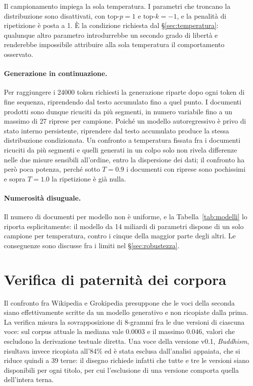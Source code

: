 Il campionamento impiega la sola temperatura. I parametri che troncano la
distribuzione sono disattivati, con $\mathrm{top}\text{-}p = 1$ e
$\mathrm{top}\text{-}k = -1$, e la penalità di ripetizione è posta a 1. È la
condizione richiesta dal §\ref{sec:temperatura}: qualunque altro parametro
introdurrebbe un secondo grado di libertà e renderebbe impossibile attribuire
alla sola temperatura il comportamento osservato.

\paragraph{Generazione in continuazione.}
Per raggiungere i \num{24000} token richiesti la generazione riparte dopo ogni
token di fine sequenza, riprendendo dal testo accumulato fino a quel punto. I
documenti prodotti sono dunque ricuciti da più segmenti, in numero variabile fino
a un massimo di 27 riprese per campione. Poiché un modello autoregressivo è privo
di stato interno persistente, riprendere dal testo accumulato produce la stessa
distribuzione condizionata. Un confronto a temperatura fissata fra i documenti
ricuciti da più segmenti e quelli generati in un colpo solo non rivela
differenze nelle due misure sensibili all'ordine, entro la dispersione dei dati;
il confronto ha però poca potenza, perché sotto $T = 0.9$ i documenti con
riprese sono pochissimi e sopra $T = 1.0$ la ripetizione è già nulla.

\paragraph{Numerosità disuguale.}
Il numero di documenti per modello non è uniforme, e la
Tabella~\ref{tab:modelli} lo riporta esplicitamente: il modello da 14 miliardi
di parametri dispone di un solo campione per temperatura, contro i cinque della
maggior parte degli altri. Le conseguenze sono discusse fra i limiti nel
§\ref{sec:robustezza}.

\section{Verifica di paternità dei corpora}
\label{sec:paternita}

Il confronto fra Wikipedia e Grokipedia presuppone che le voci della seconda
siano effettivamente scritte da un modello generativo e non ricopiate dalla
prima. La verifica misura la sovrapposizione di 8-grammi fra le due versioni di
ciascuna voce: sul corpus attuale la mediana vale $0.0003$ e il massimo $0.046$,
valori che escludono la derivazione testuale diretta. Una voce della versione
v0.1, \emph{Buddhism}, risultava invece ricopiata all'84\% ed è stata esclusa
dall'analisi appaiata, che si riduce quindi a 39 terne: il disegno richiede
infatti che tutte e tre le versioni siano disponibili per ogni titolo, per cui
l'esclusione di una versione comporta quella dell'intera terna.

